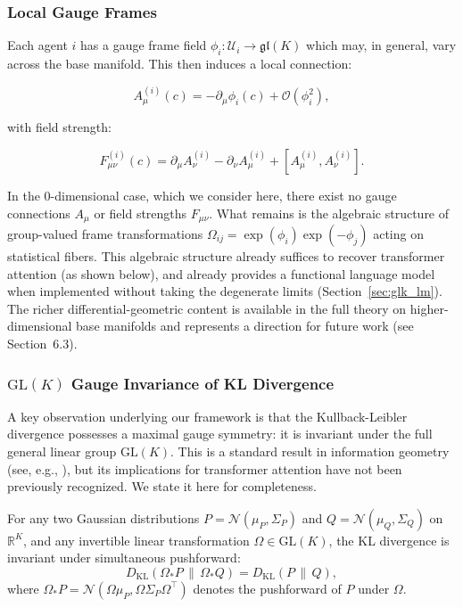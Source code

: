 \documentclass[twoside,11pt]{article}
\begin{document}
\subsubsection{Local Gauge Frames}
Each agent $i$ has a gauge frame field $\phi_i: \mathcal{U}_i \to \mathfrak{gl}(K)$ which may, in general, vary across the base manifold.  This then induces a local connection:

\begin{equation}
A^{(i)}_\mu(c) = -\partial_\mu \phi_i(c) + \mathcal{O}(\phi_i^2),
\end{equation}

with field strength:

\begin{equation}
F^{(i)}_{\mu\nu}(c) = \partial_\mu A^{(i)}_\nu - \partial_\nu A^{(i)}_\mu + [A^{(i)}_\mu, A^{(i)}_\nu].
\end{equation}

In the 0-dimensional case, which we consider here, there exist no gauge connections $A_\mu$ or field strengths $F_{\mu\nu}$. What remains is the algebraic structure of group-valued frame transformations $\Omega_{ij} = \exp(\phi_i)\exp(-\phi_j)$ acting on statistical fibers. This algebraic structure already suffices to recover transformer attention (as shown below), and already provides a functional language model when implemented without taking the degenerate limits (Section~\ref{sec:glk_lm}). The richer differential-geometric content is available in the full theory on higher-dimensional base manifolds and represents a direction for future work (see Section~6.3).


\subsubsection{$\mathrm{GL}(K)$ Gauge Invariance of KL Divergence}
\label{sec:glk_invariance}

A key observation underlying our framework is that the Kullback-Leibler divergence possesses a maximal gauge symmetry: it is invariant under the full general linear group $\mathrm{GL}(K)$. This is a standard result in information geometry (see, e.g., \citet{amari2016information}), but its implications for transformer attention have not been previously recognized. We state it here for completeness.

\begin{theorem}
\label{thm:glk_invariance}
For any two Gaussian distributions $P = \mathcal{N}(\mu_P, \Sigma_P)$ and $Q = \mathcal{N}(\mu_Q, \Sigma_Q)$ on $\mathbb{R}^K$, and any invertible linear transformation $\Omega \in \mathrm{GL}(K)$, the KL divergence is invariant under simultaneous pushforward:
\begin{equation}
D_{\mathrm{KL}}(\Omega_* P \,\|\, \Omega_* Q) = D_{\mathrm{KL}}(P \,\|\, Q),
\label{eq:glk_invariance}
\end{equation}
where $\Omega_* P = \mathcal{N}(\Omega\mu_P, \Omega\Sigma_P\Omega^\top)$ denotes the pushforward of $P$ under $\Omega$.
\end{theorem}
\end{document}
